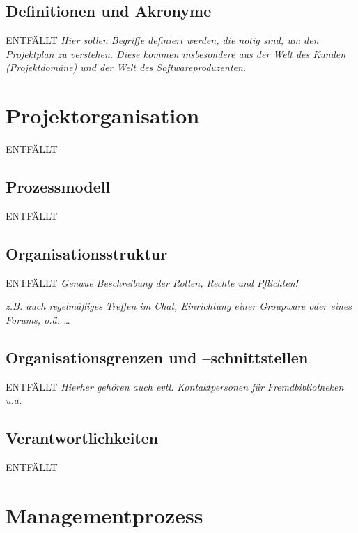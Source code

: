 \documentclass[fontsize=12pt,paper=a4,twoside]{scrartcl}
\begin{document}
{\renewcommand\section[2]{}

}

\subsection{Definitionen und Akronyme}
ENTFÄLLT
{\em Hier sollen Begriffe definiert werden, die nötig sind, um den
  Projektplan zu verstehen. Diese kommen insbesondere aus der Welt des
  Kunden (Projektdomäne) und der Welt des Softwareproduzenten.}

\section{Projektorganisation}
ENTFÄLLT
\subsection{Prozessmodell}
ENTFÄLLT
\subsection{Organisationsstruktur}
ENTFÄLLT
{\em Genaue Beschreibung der Rollen, Rechte und Pflichten!}

{\em z.B. auch regelmäßiges Treffen im Chat, Einrichtung einer
  Groupware oder eines Forums, o.ä. \dots}

\subsection{Organisationsgrenzen und --schnittstellen}
ENTFÄLLT
{\em Hierher gehören auch evtl. Kontaktpersonen für Fremdbibliotheken u.ä.}

\subsection{Verantwortlichkeiten}
ENTFÄLLT


\section{Managementprozess}
\end{document}
